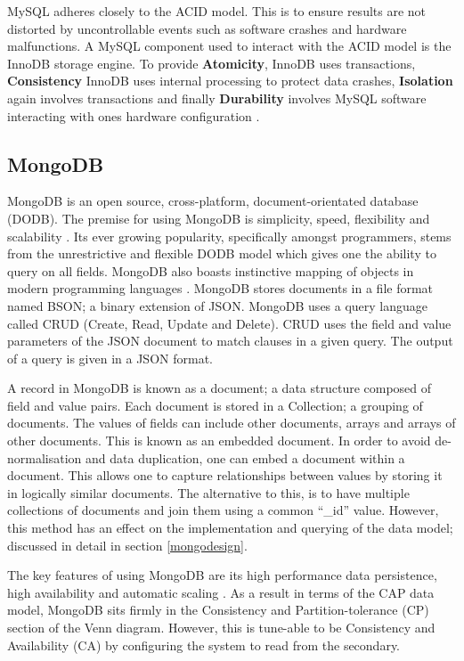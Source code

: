 MySQL adheres closely to the ACID model. This is to ensure results are not distorted by uncontrollable events such as software crashes and hardware malfunctions. A MySQL component used to interact with the ACID model is the InnoDB storage engine. To provide \textbf{Atomicity}, InnoDB uses transactions, \textbf{Consistency} InnoDB uses internal processing to protect data crashes, \textbf{Isolation} again involves transactions and finally \textbf{Durability} involves MySQL software interacting with ones hardware configuration \cite{mysqlacid}.

\subsection{MongoDB}\label{mongo}
MongoDB is an open source, cross-platform, document-orientated database (DODB). The premise for using MongoDB is simplicity, speed, flexibility and scalability \cite{md}. Its ever growing popularity, specifically amongst programmers, stems from the unrestrictive and flexible DODB model which gives one the ability to query on all fields. MongoDB also boasts instinctive mapping of objects in modern programming languages \cite{md}. MongoDB stores documents in a file format named BSON; a binary extension of JSON. MongoDB uses a query language called CRUD (Create, Read, Update and Delete). CRUD uses the field and value parameters of the JSON document to match clauses in a given query. The output of a query is given in a JSON format.

A record in MongoDB is known as a document; a data structure composed of field and value pairs. Each document is stored in a Collection; a grouping of documents. The values of fields can include other documents, arrays and arrays of other documents. This is known as an embedded document. In order to avoid de-normalisation and data duplication, one can embed a document within a document. This allows one to capture relationships between values by storing it in logically similar documents. The alternative to this, is to have multiple collections of documents and join them using a common ``\_id'' value. However, this method has an effect on the implementation and querying of the data model; discussed in detail in section \ref{mongodesign}.

The key features of using MongoDB are its high performance data persistence, high availability and automatic scaling \cite{md}. As a result in terms of the CAP data model, MongoDB sits firmly in the Consistency and Partition-tolerance (CP) section of the Venn diagram. However, this is tune-able to be Consistency and Availability (CA) by configuring the system to read from the secondary.

